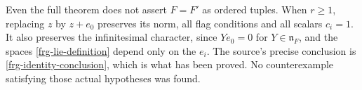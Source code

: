 Even the full theorem does not assert $F=F'$ as ordered
tuples. When $r\ge1$, replacing $z$ by $z+e_0$ preserves
its norm, all flag conditions and all scalars $c_i=1$.
It also preserves the infinitesimal character, since
$Ye_0=0$ for $Y\in\mathfrak n_F$, and the spaces
\eqref{frg-lie-definition} depend only on the $e_i$.
The source's precise conclusion is \eqref{frg-identity-conclusion},
which is what has been proved. No counterexample satisfying
those actual hypotheses was found.


